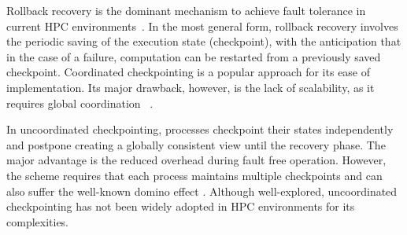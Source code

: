 Rollback recovery is the dominant mechanism to achieve fault
tolerance in current HPC environments~\cite{Elnozahy:02:Survey}. In the most general form, rollback recovery 
involves the periodic saving of the execution state (checkpoint), with the anticipation that
in the case of a failure, computation can be restarted from a previously saved checkpoint. %
Coordinated checkpointing is a popular approach for
its ease of implementation.
Its major drawback, however, is the
lack of scalability, as it requires global coordination
~\cite{elnozahy_dsc_2004}.%


In uncoordinated checkpointing, processes checkpoint their states independently and postpone creating a 
globally consistent view until the recovery phase. The major advantage is the reduced overhead during fault free operation. However, the scheme requires that
each process maintains multiple checkpoints %
and can also suffer the well-known domino effect 
 \cite{randell_domino_effect,alvisi_ftc_1999,helary_rds_1997}. %
Although well-explored, uncoordinated checkpointing has not been widely adopted
in HPC environments for its complexities. 


